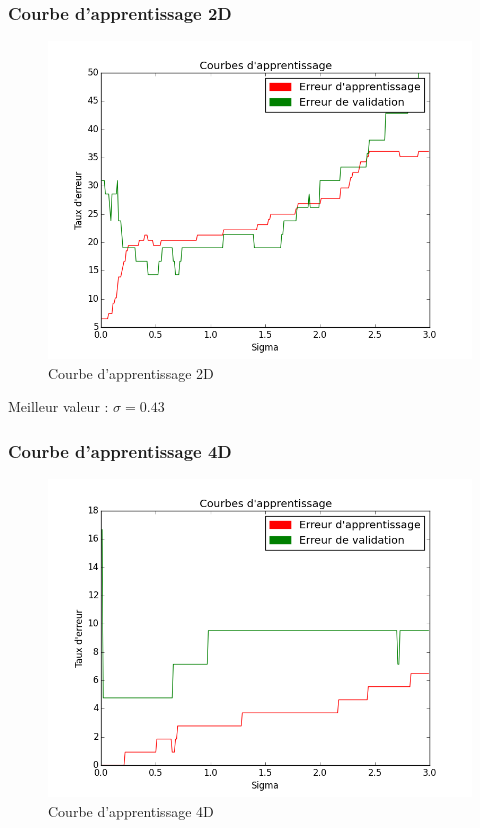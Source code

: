 \documentclass[a4paper,10pt]{article}
\begin{document}
\subsubsection{Courbe d'apprentissage 2D}
\begin{figure}[H]
	\includegraphics[width=12cm]{images/bayes_parzen_courbe_apprentissage_2d.png} 
	\centering
	\caption{Courbe d'apprentissage 2D}
	\label{fig:comp}
\end{figure}

Meilleur valeur : $\sigma = 0.43$

\subsubsection{Courbe d'apprentissage 4D}
\begin{figure}[H]
	\includegraphics[width=12cm]{images/bayes_parzen_courbe_apprentissage4D.png} 
	\centering
	\caption{Courbe d'apprentissage 4D}
	\label{fig:comp}
\end{figure}
\end{document}
